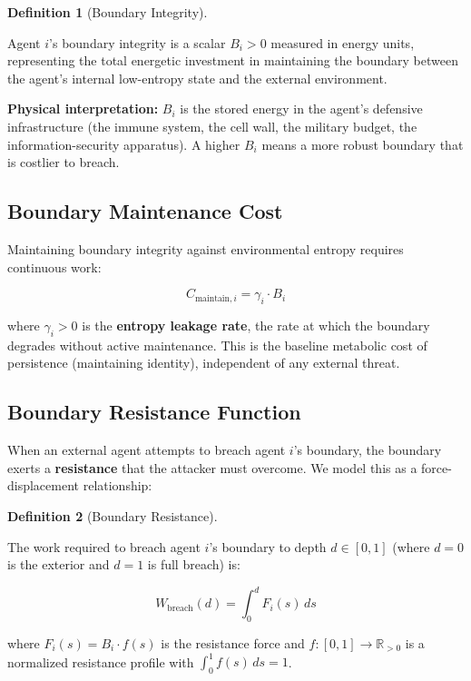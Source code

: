 \documentclass[11pt]{article}
\theoremstyle{plain}
\theoremstyle{definition}
\newtheorem{definition}{Definition}
\theoremstyle{remark}
\let\origsubsection\subsection
\renewcommand{\subsection}{\needspace{7\baselineskip}\origsubsection}
\begin{document}
\begin{definition}[Boundary Integrity]
\label{def-boundary-integrity}

Agent $i$'s boundary integrity is a scalar $B_i > 0$ measured in energy units, representing the total energetic investment in maintaining the boundary between the agent's internal low-entropy state and the external environment.
\end{definition}

\textbf{Physical interpretation:} \(B_i\) is the stored energy in the
agent's defensive infrastructure (the immune system, the cell wall, the
military budget, the information-security apparatus). A higher \(B_i\)
means a more robust boundary that is costlier to breach.

\subsection{Boundary Maintenance Cost}\label{boundary-maintenance-cost}

Maintaining boundary integrity against environmental entropy requires
continuous work:

\[C_{\text{maintain},i} = \gamma_i \cdot B_i\]

where \(\gamma_i > 0\) is the \textbf{entropy leakage rate}, the rate at
which the boundary degrades without active maintenance. This is the
baseline metabolic cost of persistence (maintaining identity),
independent of any external threat.

\subsection{Boundary Resistance
Function}\label{boundary-resistance-function}

When an external agent attempts to breach agent \(i\)'s boundary, the
boundary exerts a \textbf{resistance} that the attacker must overcome.
We model this as a force-displacement relationship:

\begin{definition}[Boundary Resistance]
\label{def-boundary-resistance}

The work required to breach agent $i$'s boundary to depth $d \in [0, 1]$ (where $d = 0$ is the exterior and $d = 1$ is full breach) is:

$$W_{\text{breach}}(d) = \int_0^d F_i(s) \, ds$$

where $F_i(s) = B_i \cdot f(s)$ is the resistance force and $f : [0, 1] \to \mathbb{R}_{> 0}$ is a normalized resistance profile with $\int_0^1 f(s) \, ds = 1$.
\end{definition}
\end{document}
